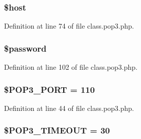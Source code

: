 \subsubsection[{\texorpdfstring{\$host}{$host}}]{\setlength{\rightskip}{0pt plus 5cm}\${\bf host}}\hypertarget{class_p_o_p3_a711797613cb863ca0756df789c396bf2}{}\label{class_p_o_p3_a711797613cb863ca0756df789c396bf2}


Definition at line 74 of file class.\+pop3.\+php.

\subsubsection[{\texorpdfstring{\$password}{$password}}]{\setlength{\rightskip}{0pt plus 5cm}\${\bf password}}\hypertarget{class_p_o_p3_a607686ef9f99ea7c42f4f3dd3dbb2b0d}{}\label{class_p_o_p3_a607686ef9f99ea7c42f4f3dd3dbb2b0d}


Definition at line 102 of file class.\+pop3.\+php.

\subsubsection[{\texorpdfstring{\$\+P\+O\+P3\+\_\+\+P\+O\+RT}{$POP3_PORT}}]{\setlength{\rightskip}{0pt plus 5cm}\$P\+O\+P3\+\_\+\+P\+O\+RT = 110}\hypertarget{class_p_o_p3_a1b5e612c53a85355ca0a5ef5121becfb}{}\label{class_p_o_p3_a1b5e612c53a85355ca0a5ef5121becfb}


Definition at line 44 of file class.\+pop3.\+php.

\subsubsection[{\texorpdfstring{\$\+P\+O\+P3\+\_\+\+T\+I\+M\+E\+O\+UT}{$POP3_TIMEOUT}}]{\setlength{\rightskip}{0pt plus 5cm}\$P\+O\+P3\+\_\+\+T\+I\+M\+E\+O\+UT = 30}\hypertarget{class_p_o_p3_a5a68cb992276c956e16214f08e62ce3a}{}\label{class_p_o_p3_a5a68cb992276c956e16214f08e62ce3a}


